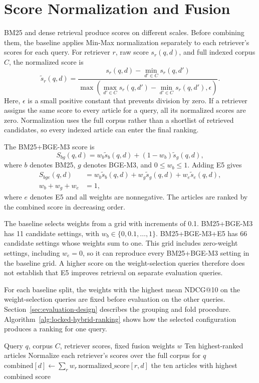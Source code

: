 \section{Score Normalization and Fusion}
\label{sec:score-fusion}

BM25 and dense retrieval produce scores on different scales. Before combining them, the baseline applies Min-Max normalization separately to each retriever's scores for each query. For retriever \(r\), raw score \(s_r(q,d)\), and full indexed corpus \(C\), the normalized score is
\[
\widetilde{s}_r(q,d)=\frac{s_r(q,d)-\min_{d'\in C}s_r(q,d')}{\max\left(\max_{d'\in C}s_r(q,d')-\min_{d'\in C}s_r(q,d'),\epsilon\right)}.
\]
Here, \(\epsilon\) is a small positive constant that prevents division by zero. If a retriever assigns the same score to every article for a query, all its normalized scores are zero. Normalization uses the full corpus rather than a shortlist of retrieved candidates, so every indexed article can enter the final ranking.

The BM25+BGE-M3 score is
\[
S_{bg}(q,d)
=w_b\widetilde{s}_{b}(q,d)+(1-w_b)\widetilde{s}_{g}(q,d),
\]
where \(b\) denotes BM25, \(g\) denotes BGE-M3, and \(0\leq w_b\leq1\). Adding E5 gives
\[
\begin{aligned}
S_{bge}(q,d)
&=w_b\widetilde{s}_{b}(q,d)+w_g\widetilde{s}_{g}(q,d)
+w_e\widetilde{s}_{e}(q,d),\\
w_b+w_g+w_e&=1,
\end{aligned}
\]
where \(e\) denotes E5 and all weights are nonnegative. The articles are ranked by the combined score in decreasing order.

The baseline selects weights from a grid with increments of 0.1. BM25+BGE-M3 has 11 candidate settings, with \(w_b\in\{0,0.1,\ldots,1\}\). BM25+BGE-M3+E5 has 66 candidate settings whose weights sum to one. This grid includes zero-weight settings, including \(w_e=0\), so it can reproduce every BM25+BGE-M3 setting in the baseline grid. A higher score on the weight-selection queries therefore does not establish that E5 improves retrieval on separate evaluation queries.

For each baseline split, the weights with the highest mean NDCG@10 on the weight-selection queries are fixed before evaluation on the other queries. Section~\ref{sec:evaluation-design} describes the grouping and fold procedure. Algorithm~\ref{alg:locked-hybrid-ranking} shows how the selected configuration produces a ranking for one query.

\begin{algorithm}[H]
\caption{Article ranking with fixed fusion weights}
\label{alg:locked-hybrid-ranking}
\footnotesize
\begin{algorithmic}[1]
\Require Query $q$, corpus $C$, retriever scores, fixed fusion weights $w$
\Ensure Ten highest-ranked articles
\State Normalize each retriever's scores over the full corpus for $q$
    \State $\mathrm{combined}[d]\gets\sum_r w_r\,\mathrm{normalized\_score}[r,d]$
\EndFor
\State \Return the ten articles with highest combined score
\end{algorithmic}
\end{algorithm}

